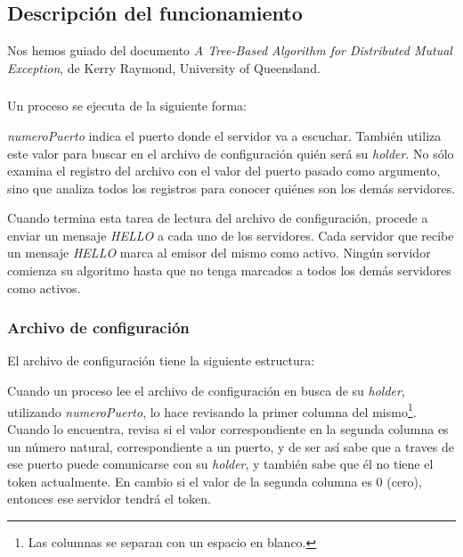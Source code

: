 \subsection{Descripción del funcionamiento}

Nos hemos guiado del documento \emph{A Tree-Based Algorithm for Distributed
Mutual Exception}, de Kerry Raymond, University of Queensland.

\subsubsection{}

Un proceso  se ejecuta de la siguiente forma:


\emph{numeroPuerto} indica el puerto donde el servidor va a escuchar. También
utiliza este valor para buscar en el archivo de configuración
 quién será su \emph{holder}. No sólo examina el
registro del archivo con el valor del puerto pasado como argumento, sino que
analiza todos los registros para conocer quiénes son los demás servidores.

Cuando termina esta tarea de lectura del archivo de configuración, procede a
enviar un mensaje \emph{HELLO} a cada uno de los servidores. Cada servidor que
recibe un mensaje \emph{HELLO} marca al emisor del mismo como activo. Ningún
servidor comienza su algoritmo hasta que no tenga marcados a todos los demás
servidores como activos.


\subsubsection{Archivo de configuración }

El archivo de configuración tiene la siguiente estructura:


Cuando un proceso  lee el archivo de configuración en busca de
su \emph{holder}, utilizando \emph{numeroPuerto}, lo hace revisando la primer
columna del mismo\footnote{Las columnas se separan con un espacio en blanco.}.
Cuando lo encuentra, revisa si el valor correspondiente en la segunda columna
es un número natural, correspondiente a un puerto, y de ser así sabe que a
traves de ese puerto puede comunicarse con su \emph{holder}, y también sabe que
él no tiene el token actualmente. En cambio si el valor de la segunda columna es
0 (cero), entonces ese servidor tendrá el token.

